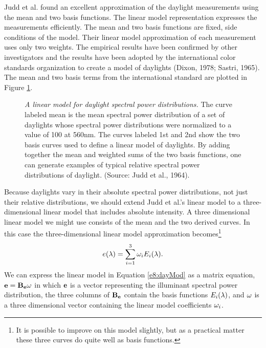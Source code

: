 Judd et al. found an excellent approximation of the daylight
measurements using the mean and two basis functions.  The linear model
representation expresses the measurements efficiently.  The mean and
two basis functions are fixed, side conditions of the model.  Their
linear model approximation of each measurement uses only two weights.
The empirical results have been confirmed by other investigators and
the results have been adopted by the international color standards
organization to create a model of daylights (Dixon, 1978; Sastri,
1965).  The mean and two basis terms from the international standard
are plotted in Figure \ref{f8:linearModDay}.
\begin{figure}
\centerline{
}
\caption[Linear Model Curves for Daylight] {
{\em A linear model for daylight spectral power distributions.}  The
curve labeled mean is the mean spectral power distribution of a set of
daylights whose spectral power distributions were normalized to a
value of 100 at 560nm.  The curves labeled 1st and 2nd show the two
basis curves used to define a linear model of daylights.  By adding
together the mean and weighted sums of the two basis functions, one
can generate examples of typical relative spectral power distributions
of daylight. (Source: Judd et al., 1964).
}
\label{f8:linearModDay}
\end{figure}

Because daylights vary in their absolute spectral power distributions,
not just their relative distributions, we should
extend Judd et al.'s linear model to a three-dimensional
linear model that includes absolute intensity.
A three dimensional linear model
we might use consists of the mean and the two
derived curves.  In this case the three-dimensional linear model
approximation becomes\footnote{It is possible to improve on this model
slightly, but as a practical matter these three curves do quite well
as basis functions.} 
\begin{equation}
\label{e8:dayMod}
\mbox{$e(\lambda)$} = \sum_{i=1}^{3} \mbox{$\omega_{i}$} \mbox{$E_{i}(\lambda)$} .
\end{equation}
We can express the linear model in Equation \ref{e8:dayMod} as a
matrix equation, $\mbox{$\bf e$} = \mbox{$\bf B_e$} \mbox{${\bf \omega}$}$ in which $\mbox{$\bf e$}$ is
a vector representing the illuminant spectral power distribution, the
three columns of $\mbox{$\bf B_e$}$ contain the basis functions
$\mbox{$E_{i}(\lambda)$}$, and $\mbox{${\bf \omega}$}$ is a three dimensional vector
containing the linear model coefficients $\mbox{$\omega_{i}$}$.

